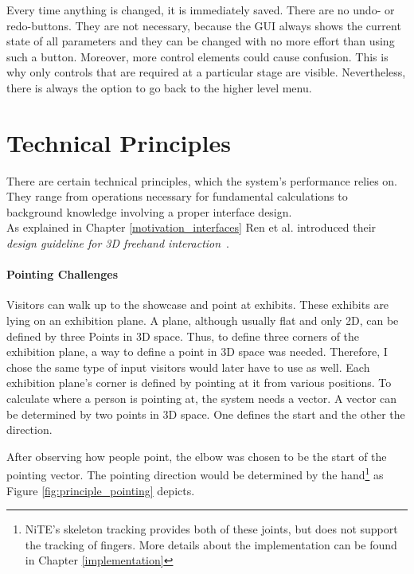 Every time anything is changed, it is immediately saved. There are no undo- or redo-buttons. They are not necessary, because the \ac{GUI} always shows the current state of all parameters and they can be changed with no more effort than using such a button. Moreover, more control elements could cause confusion. This is why only controls that are required at a particular stage are visible. Nevertheless, there is always the option to go back to the higher level menu.


\section{Technical Principles}
\label{installation_tech}

There are certain technical principles, which the system's performance relies on. They range from operations necessary for fundamental calculations to background knowledge involving a proper interface design.
\\
As explained in Chapter \ref{motivation_interfaces} Ren et al. introduced their \textit{design guideline for 3D freehand interaction}~\cite{FreehandSelectionCnG}.


\paragraph{Pointing Challenges}

Visitors can walk up to the showcase and point at exhibits. These exhibits are lying on an exhibition plane. A plane, although usually flat and only \ac{2D}, can be defined by three Points in \ac{3D} space. Thus, to define three corners of the exhibition plane, a way to define a point in \ac{3D} space was needed. Therefore, I chose the same type of input visitors would later have to use as well. Each exhibition plane's corner is defined by pointing at it from various positions. To calculate where a person is pointing at, the system needs a vector. A vector can be determined by two points in \ac{3D} space. One defines the start and the other the direction.

After observing how people point, the elbow was chosen to be the start of the pointing vector. The pointing direction would be determined by the hand\footnote{NiTE's skeleton tracking provides both of these joints, but does not support the tracking of fingers. More details about the implementation can be found in Chapter \ref{implementation}} as Figure \ref{fig:principle_pointing} depicts.

